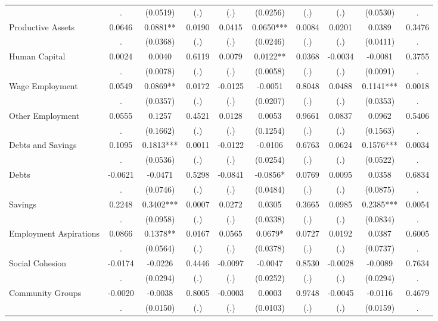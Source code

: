 \begin{tabular}{l*{9}{c}}
  & . & (0.0519) & (.) & (.) & (0.0256) & (.) & (.) & (0.0530) & . \\
Productive Assets & 0.0646 & 0.0881** & 0.0190 & 0.0415 & 0.0650*** & 0.0084 & 0.0201 & 0.0389 & 0.3476 \\
  & . & (0.0368) & (.) & (.) & (0.0246) & (.) & (.) & (0.0411) & . \\
Human Capital & 0.0024 & 0.0040 & 0.6119 & 0.0079 & 0.0122** & 0.0368 & -0.0034 & -0.0081 & 0.3755 \\
  & . & (0.0078) & (.) & (.) & (0.0058) & (.) & (.) & (0.0091) & . \\
Wage Employment & 0.0549 & 0.0869** & 0.0172 & -0.0125 & -0.0051 & 0.8048 & 0.0488 & 0.1141*** & 0.0018 \\
  & . & (0.0357) & (.) & (.) & (0.0207) & (.) & (.) & (0.0353) & . \\
Other Employment & 0.0555 & 0.1257 & 0.4521 & 0.0128 & 0.0053 & 0.9661 & 0.0837 & 0.0962 & 0.5406 \\
  & . & (0.1662) & (.) & (.) & (0.1254) & (.) & (.) & (0.1563) & . \\
Debts and Savings & 0.1095 & 0.1813*** & 0.0011 & -0.0122 & -0.0106 & 0.6763 & 0.0624 & 0.1576*** & 0.0034 \\
  & . & (0.0536) & (.) & (.) & (0.0254) & (.) & (.) & (0.0522) & . \\
Debts & -0.0621 & -0.0471 & 0.5298 & -0.0841 & -0.0856* & 0.0769 & 0.0095 & 0.0358 & 0.6834 \\
  & . & (0.0746) & (.) & (.) & (0.0484) & (.) & (.) & (0.0875) & . \\
Savings & 0.2248 & 0.3402*** & 0.0007 & 0.0272 & 0.0305 & 0.3665 & 0.0985 & 0.2385*** & 0.0054 \\
  & . & (0.0958) & (.) & (.) & (0.0338) & (.) & (.) & (0.0834) & . \\
Employment Aspirations & 0.0866 & 0.1378** & 0.0167 & 0.0565 & 0.0679* & 0.0727 & 0.0192 & 0.0387 & 0.6005 \\
  & . & (0.0564) & (.) & (.) & (0.0378) & (.) & (.) & (0.0737) & . \\
Social Cohesion & -0.0174 & -0.0226 & 0.4446 & -0.0097 & -0.0047 & 0.8530 & -0.0028 & -0.0089 & 0.7634 \\
  & . & (0.0294) & (.) & (.) & (0.0252) & (.) & (.) & (0.0294) & . \\
Community Groups & -0.0020 & -0.0038 & 0.8005 & -0.0003 & 0.0003 & 0.9748 & -0.0045 & -0.0116 & 0.4679 \\
  & . & (0.0150) & (.) & (.) & (0.0103) & (.) & (.) & (0.0159) & . \\

\end{tabular}
